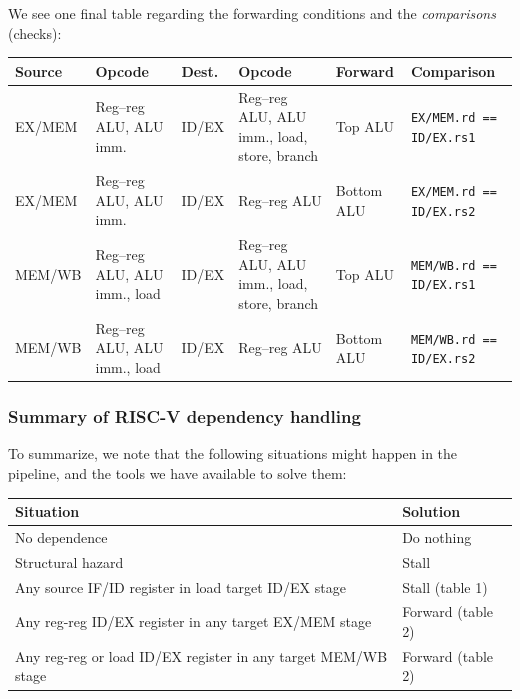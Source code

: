 \documentclass[a4paper,11pt]{article}
\begin{document}
We see one final table regarding the forwarding conditions and the \textit{comparisons} (checks):
\begin{table}[H]
	\center {}
	\small
	\begin{tabular}{p{2cm} | p{2cm} | p{2cm} | p{2cm} | p{2cm} | p{2cm}}
		\textbf{Source}  & \textbf{Opcode}                             &
		\textbf{Dest.}   & \textbf{Opcode}                             &
		\textbf{Forward} & \textbf{Comparison}                           \\ \hline

		EX/MEM           & Reg--reg ALU, ALU imm.                      &
		ID/EX            & Reg--reg ALU, ALU imm., load, store, branch &
		Top ALU          &
		\texttt{EX/MEM.rd == ID/EX.rs1}                                  \\

		EX/MEM           & Reg--reg ALU, ALU imm.                      &
		ID/EX            & Reg--reg ALU                                &
		Bottom ALU       &
		\texttt{EX/MEM.rd == ID/EX.rs2}                                  \\

		MEM/WB           & Reg--reg ALU, ALU imm., load                &
		ID/EX            & Reg--reg ALU, ALU imm., load, store, branch &
		Top ALU          &
		\texttt{MEM/WB.rd == ID/EX.rs1}                                  \\

		MEM/WB           & Reg--reg ALU, ALU imm., load                &
		ID/EX            & Reg--reg ALU                                &
		Bottom ALU       &
		\texttt{MEM/WB.rd == ID/EX.rs2}
	\end{tabular}
\end{table}

\subsubsection{Summary of RISC-V dependency handling}

To summarize, we note that the following situations might happen in the pipeline, and the tools we have available to solve them:

\begin{table}[H]
	\center {}
	\begin{tabular}{ p{7cm} | p{7cm} }
		\bfseries Situation                                           & \bfseries Solution \\
		\hline
		No dependence                                                 & Do nothing         \\
		Structural hazard                                             & Stall              \\
		Any source IF/ID register in load target ID/EX stage          & Stall (table 1)    \\
		Any reg-reg ID/EX register in any target EX/MEM stage         & Forward (table 2)  \\
		Any reg-reg or load ID/EX register in any target MEM/WB stage & Forward (table 2)  \\
	\end{tabular}
\end{table}
\end{document}
